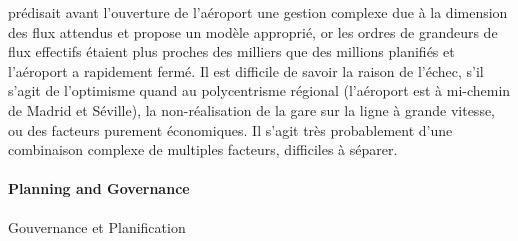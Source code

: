 {\cite{otamendi2008selection} prédisait avant l'ouverture de l'aéroport une gestion complexe due à la dimension des flux attendus et propose un modèle approprié, or les ordres de grandeurs de flux effectifs étaient plus proches des milliers que des millions planifiés et l'aéroport a rapidement fermé. Il est difficile de savoir la raison de l'échec, s'il s'agit de l'optimisme quand au polycentrisme régional (l'aéroport est à mi-chemin de Madrid et Séville), la non-réalisation de la gare sur la ligne à grande vitesse, ou des facteurs purement économiques. Il s'agit très probablement d'une combinaison complexe de multiples facteurs, difficiles à séparer.
}




\paragraph{Planning and Governance}{Gouvernance et Planification}

